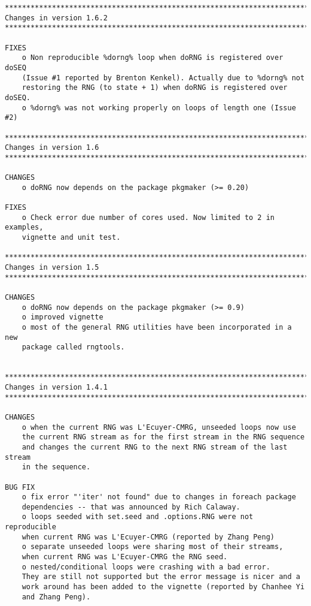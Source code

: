 \documentclass[a4paper,12pt]{article}\usepackage[]{graphicx}\usepackage[]{color}
\begin{document}
{\scriptsize
\begin{verbatim}
*************************************************************************
Changes in version 1.6.2
*************************************************************************

FIXES
    o Non reproducible %dorng% loop when doRNG is registered over doSEQ 
    (Issue #1 reported by Brenton Kenkel). Actually due to %dorng% not 
    restoring the RNG (to state + 1) when doRNG is registered over doSEQ.
    o %dorng% was not working properly on loops of length one (Issue #2)  

*************************************************************************
Changes in version 1.6
*************************************************************************

CHANGES
    o doRNG now depends on the package pkgmaker (>= 0.20)
    
FIXES
    o Check error due number of cores used. Now limited to 2 in examples,
    vignette and unit test.

*************************************************************************
Changes in version 1.5
*************************************************************************

CHANGES
    o doRNG now depends on the package pkgmaker (>= 0.9)
    o improved vignette
    o most of the general RNG utilities have been incorporated in a new
    package called rngtools.
    

*************************************************************************
Changes in version 1.4.1
*************************************************************************

CHANGES
    o when the current RNG was L'Ecuyer-CMRG, unseeded loops now use 
    the current RNG stream as for the first stream in the RNG sequence 
    and changes the current RNG to the next RNG stream of the last stream 
    in the sequence. 

BUG FIX
    o fix error "'iter' not found" due to changes in foreach package 
    dependencies -- that was announced by Rich Calaway.
    o loops seeded with set.seed and .options.RNG were not reproducible
    when current RNG was L'Ecuyer-CMRG (reported by Zhang Peng)
    o separate unseeded loops were sharing most of their streams, 
    when current RNG was L'Ecuyer-CMRG the RNG seed.
    o nested/conditional loops were crashing with a bad error. 
    They are still not supported but the error message is nicer and a 
    work around has been added to the vignette (reported by Chanhee Yi 
    and Zhang Peng).


\end{verbatim}}
\end{document}
